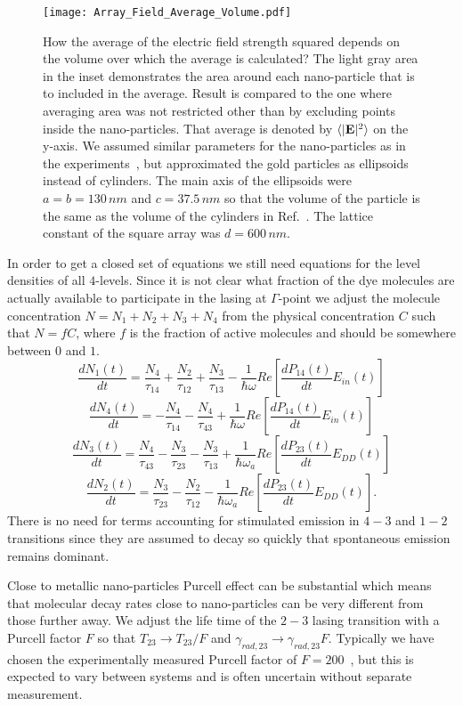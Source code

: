 \documentclass{iopart}
\newcommand{\beq}{\begin{equation}}
\newcommand{\enq}{\end{equation}}
\begin{document}
\begin{figure} %
\texttt{[image: Array\_Field\_Average\_Volume.pdf]}
\caption[Fig1]{How the average of the electric field strength squared depends on the volume over which the average is calculated? The light gray area in the inset demonstrates the area around each nano-particle
that is to included in the average. Result is compared to the one where averaging area was not restricted
other than by excluding points inside the nano-particles. That average
is denoted by $\langle |{\bf E}|^2\rangle$ on the y-axis.
We assumed similar parameters for the nano-particles as in the experiments~\cite{zhou_lasing_2013},
but approximated the gold particles as ellipsoids instead of cylinders. 
The main axis of the ellipsoids were $a=b=130\, nm$ and $c=37.5\, nm$ so that the volume of the particle is the same as the volume of the cylinders in Ref.~\cite{zhou_lasing_2013}. The lattice constant of the square array was $d=600\, nm$.
}
\label{fig:DDaveraging}
\end{figure} 


In order to get a closed set of equations 
we still need equations for the level densities
of all $4$-levels. Since it is not clear what fraction
of the dye molecules are actually available to participate
in the lasing at $\Gamma$-point we adjust the molecule
concentration $N=N_1+N_2+N_3+N_4$ from the physical concentration $C$
such that $N=fC$, where $f$ is the fraction of active molecules
and should be somewhere between $0$ and $1$.
\beq
\frac{dN_{1}(t)}{dt}=\frac{N_4}{\tau_{14}}+\frac{N_2}{\tau_{12}}+\frac{N_3}{\tau_{13}}-\frac{1}{\hbar\omega}
Re\left[\frac{dP_{14}(t)}{dt} E_{in}(t)\right]
\enq
\beq
\frac{dN_{4}(t)}{dt}=-\frac{N_4}{\tau_{14}}-\frac{N_4}{\tau_{43}}+\frac{1}{\hbar\omega}
Re\left[\frac{dP_{14}(t)}{dt} E_{in}(t)\right]
\enq
\beq
\frac{dN_{3}(t)}{dt}=\frac{N_4}{\tau_{43}}-\frac{N_3}{\tau_{23}}-\frac{N_3}{\tau_{13}}+\frac{1}{\hbar\omega_a}
Re\left[\frac{dP_{23}(t)}{dt} E_{DD}(t)\right]
\enq
\beq
\frac{dN_{2}(t)}{dt}=\frac{N_3}{\tau_{23}}-\frac{N_2}{\tau_{12}}-\frac{1}{\hbar\omega_a}
Re\left[\frac{dP_{23}(t)}{dt}E_{DD}(t)\right].
\enq
There is no need for terms accounting for stimulated emission
in $4-3$ and $1-2$ transitions since they are assumed to decay so quickly
that spontaneous emission remains dominant.

Close to metallic nano-particles Purcell effect can be 
substantial which means that molecular decay rates close to nano-particles
can be very different from those further away. We adjust the life time
of the $2-3$ lasing transition with a Purcell factor $F$ so that
$T_{23}\rightarrow T_{23}/F$ and $\gamma_{rad,23}\rightarrow \gamma_{rad,23}F$. Typically we have chosen the experimentally measured Purcell factor of $F=200$~\cite{zhou_lasing_2013}, but this is expected
to vary between systems and is often uncertain without separate
measurement.
\end{document}
